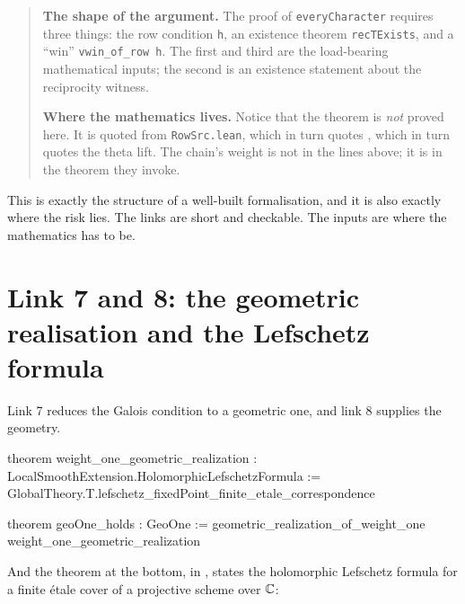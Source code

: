 \begin{quote}
\textbf{The shape of the argument.} The proof of \texttt{everyCharacter}
requires three things: the row condition \texttt{h}, an existence theorem
\texttt{recTExists}, and a ``win'' \texttt{vwin\_of\_row h}. The first and
third are the load-bearing mathematical inputs; the second is an existence
statement about the reciprocity witness.

\textbf{Where the mathematics lives.} Notice that the theorem
 is \emph{not} proved here. It
is quoted from \texttt{RowSrc.lean}, which in turn quotes
, which in turn quotes the
theta lift. The chain's weight is not in the lines above; it is in the
theorem they invoke.
\end{quote}

This is exactly the structure of a well-built formalisation, and it is also
exactly where the risk lies. The links are short and checkable. The inputs
are where the mathematics has to be.

\section{Link 7 and 8: the geometric realisation and the Lefschetz formula}Link 7 reduces the Galois condition to a geometric one, and link 8 supplies the
geometry.

\begin{seamnote}{}
\begin{leanquote}
theorem weight_one_geometric_realization :
    LocalSmoothExtension.HolomorphicLefschetzFormula :=
  GlobalTheory.T.lefschetz_fixedPoint_finite_etale_correspondence

theorem geoOne_holds : GeoOne :=
  geometric_realization_of_weight_one weight_one_geometric_realization
\end{leanquote}
\end{seamnote}

And the theorem at the bottom, in
,
states the holomorphic Lefschetz formula for a finite étale cover of a
projective scheme over $\mathbb{C}$:

